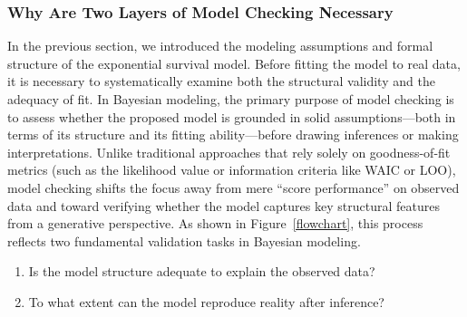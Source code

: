 \subsubsection{Why Are Two Layers of Model Checking Necessary}
In the previous section, we introduced the modeling assumptions and formal structure of the exponential survival model. Before fitting the model to real data, it is necessary to systematically examine both the structural validity and the adequacy of fit. In Bayesian modeling, the primary purpose of model checking is to assess whether the proposed model is grounded in solid assumptions—both in terms of its structure and its fitting ability—before drawing inferences or making interpretations. Unlike traditional approaches that rely solely on goodness-of-fit metrics (such as the likelihood value or information criteria like WAIC or LOO), model checking shifts the focus away from mere “score performance” on observed data and toward verifying whether the model captures key structural features from a generative perspective. As shown in Figure~\ref{flowchart}, this process reflects two fundamental validation tasks in Bayesian modeling.
\begin{enumerate}
    \item Is the model structure adequate to explain the observed data?
    \item To what extent can the model reproduce reality after inference?
\end{enumerate}
